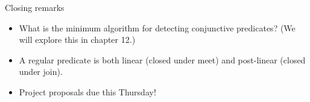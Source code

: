 \documentclass{beamer}
\begin{document}
\begin{frame}{Closing remarks}
\begin{itemize}
    \item What is the minimum algorithm for detecting conjunctive
    predicates? (We will explore this in chapter 12.)
    \item A regular predicate is both linear (closed under meet) and
    post-linear (closed under join).
    \item Project proposals due this Thursday!
\end{itemize}
    
\end{frame}
\end{document}
